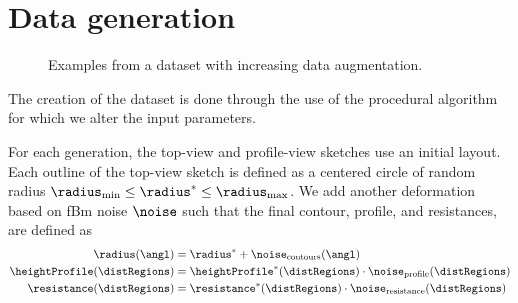 \section{Data generation}
\label{sec:coral-island_dataset-generation}



\begin{figure}
	\centering
    \caption{Examples from a dataset with increasing data augmentation.}
    \label{fig:coral-island_cGAN-examples}
\end{figure}


The creation of the dataset is done through the use of the procedural algorithm for which we alter the input parameters. 

For each generation, the top-view and profile-view sketches use an initial layout. Each outline of the top-view sketch is defined as a centered circle of random radius $\radius_\text{min} \leq \radius^* \leq \radius_\text{max}$. We add another deformation based on fBm noise $\noise$ such that the final contour, profile, and resistances, are defined as 
\begin{align}
    \radius(\angl) &= \radius^* + \noise_{\text{contours}}(\angl) \nonumber \\
    \heightProfile(\distRegions) &= \heightProfile^*(\distRegions) \cdot \noise_{\text{profile}}(\distRegions) \nonumber \\
    \resistance(\distRegions) &= \resistance^*(\distRegions) \cdot \noise_{\text{resistance}}(\distRegions) \nonumber
\end{align}


